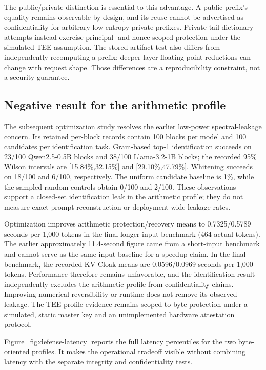 The public/private distinction is essential to this advantage. A public prefix's equality remains observable by design, and its reuse cannot be advertised as confidentiality for arbitrary low-entropy private prefixes. Private-tail dictionary attempts instead exercise principal- and nonce-scoped protection under the simulated TEE assumption. The stored-artifact test also differs from independently recomputing a prefix: deeper-layer floating-point reductions can change with request shape. Those differences are a reproducibility constraint, not a security guarantee.

\subsection{Negative result for the arithmetic profile}
The subsequent optimization study resolves the earlier low-power spectral-leakage concern. Its retained per-block records contain 100 blocks per model and 100 candidates per identification task. Gram-based top-1 identification succeeds on 23/100 Qwen2.5-0.5B blocks and 38/100 Llama-3.2-1B blocks; the recorded 95\% Wilson intervals are [15.84\%,32.15\%] and [29.10\%,47.79\%]. Whitening succeeds on 18/100 and 6/100, respectively. The uniform candidate baseline is 1\%, while the sampled random controls obtain 0/100 and 2/100. These observations support a closed-set identification leak in the arithmetic profile; they do not measure exact prompt reconstruction or deployment-wide leakage rates.

Optimization improves arithmetic protection/recovery means to 0.7325/0.5789 seconds per 1,000 tokens in the final longer-input benchmark (464 actual tokens). The earlier approximately 11.4-second figure came from a short-input benchmark and cannot serve as the same-input baseline for a speedup claim. In the final benchmark, the recorded KV-Cloak means are 0.0596/0.0969 seconds per 1,000 tokens. Performance therefore remains unfavorable, and the identification result independently excludes the arithmetic profile from confidentiality claims. Improving numerical reversibility or runtime does not remove its observed leakage. The TEE-profile evidence remains scoped to byte protection under a simulated, static master key and an unimplemented hardware attestation protocol.

Figure~\ref{fig:defense-latency} reports the full latency percentiles for the two byte-oriented profiles. It makes the operational tradeoff visible without combining latency with the separate integrity and confidentiality tests.

